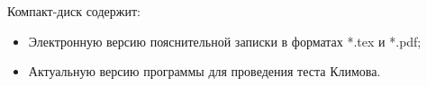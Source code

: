 Компакт-диск содержит: 
\begin{itemize}
\item Электронную версию пояснительной записки в форматах *.tex и *.pdf;
\item Актуальную версию программы для проведения теста Климова.
\end{itemize}